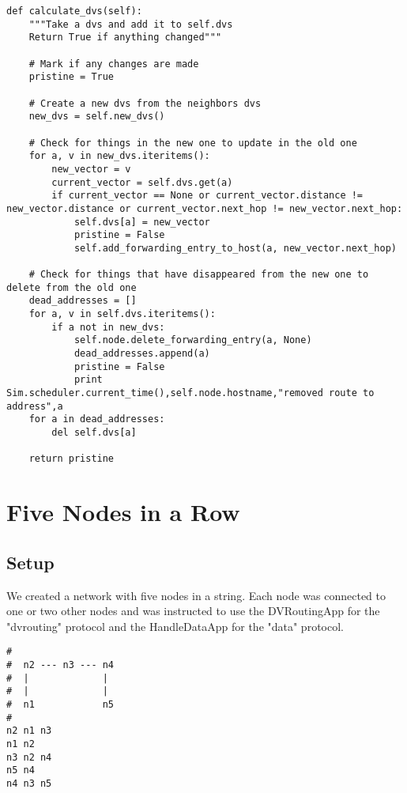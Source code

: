 \documentclass[11pt]{article}
\begin{document}
\begin{lstlisting}
def calculate_dvs(self):
    """Take a dvs and add it to self.dvs
    Return True if anything changed"""

    # Mark if any changes are made
    pristine = True

    # Create a new dvs from the neighbors dvs
    new_dvs = self.new_dvs()

    # Check for things in the new one to update in the old one
    for a, v in new_dvs.iteritems():
        new_vector = v
        current_vector = self.dvs.get(a)
        if current_vector == None or current_vector.distance != new_vector.distance or current_vector.next_hop != new_vector.next_hop:
            self.dvs[a] = new_vector
            pristine = False
            self.add_forwarding_entry_to_host(a, new_vector.next_hop)

    # Check for things that have disappeared from the new one to delete from the old one
    dead_addresses = []
    for a, v in self.dvs.iteritems():
        if a not in new_dvs:
            self.node.delete_forwarding_entry(a, None)
            dead_addresses.append(a)
            pristine = False
            print Sim.scheduler.current_time(),self.node.hostname,"removed route to address",a
    for a in dead_addresses:
        del self.dvs[a]

    return pristine
\end{lstlisting}

\vspace{5mm}

\section{Five Nodes in a Row}

\subsection{Setup}

We created a network with five nodes in a string. Each node was connected to one or two other nodes and was instructed to use the DVRoutingApp for the "dvrouting" protocol and the HandleDataApp for the "data" protocol.

\vspace{5mm}

\begin{lstlisting}
#
#  n2 --- n3 --- n4
#  |             |
#  |             |
#  n1            n5
# 
n2 n1 n3
n1 n2
n3 n2 n4
n5 n4
n4 n3 n5
\end{lstlisting}
\end{document}
